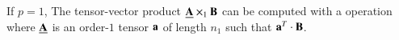 \begin{comment}
\midrule
6 & $>2$ & any    & $\pi_1$  & \tf{gemm(rm)} & $\mbB$  & $\mbnq$ & $m$     & $n_q$ & $\mubA$ & $n_q$ & $\mbB$  & $n_q$ & $m$\\
  & $>2$ & any    & $\pi_1$  & \tf{gemm(cm)} & $\mbB$  & $m$     & $\mbnq$ & $n_q$ & $\mbB$  & $n_q$ & $\mubA$ & $n_q$ & $m$\\
7 & $>2$ & any    & $\pi_p$  & \tf{gemm(rm)} & -       & $m$     & $\mbnq$ & $n_q$ & $\mbB$  & $n_q$ & $\mubA$  & $\mbnq$ & $\mbnq$ \\
  & $>2$ & any    & $\pi_p$  & \tf{gemm(cm)} & -       & $\mbnq$ & $m$     & $n_q$ & $\mubA$  & $\mbnq$ & $\mbB$  & $n_q$ & $\mbnq$ \\
\midrule
8 & $>2$ & any & \ $\pi_2,..,\pi_{p-1}$ \ & \tf{gemm(rm)*} & - & $m$ & $n_{\pi_1}$ & $n_q$ & $\mbB$ & $n_q$ & $\mubA$ & $w_{q}$  & $w_{q}$ \\
  & $>2$ & any & \ $\pi_2,..,\pi_{p-1}$ \ & \tf{gemm(cm)*} & - & $n_{\pi_1}$ & $m$ & $n_q$ & $\mubA$ & $w_{q}$ & $\mbB$ & $n_q$ & $w_{q}$ \\
\bottomrule \\
\end{tabular}
\caption%
{%
\footnotesize
Eight cases with \tf{gemv} and \tf{gemm} for the mode-$q$ tensor-matrix multiplication.
Arguments \tf{T}, \tf{M}, \tf{N}, etc. of the BLAS are chosen with respect to the tensor order $p$, layout $\mbpi$ and contraction mode $q$ where \tf{T} specifies if $\mbB$ is transposed.
\tf{gemm*} denotes multiple \tf{gemm} calls with different tensor slices.
Argument $\bar{n}_q$ for case 6 and 7 is given by $\bar{n}_q = 1/n_q \prod_r^p n_r$.
Matrix $\mbB$ has the row-major format.
}
\label{tab:mapping_rm}
\end{table*}
\end{comment}



If $p=1$, The tensor-vector product $\underline{\mathbf{A}} \times_1 \mathbf{B}$ can be computed with a  operation where $\underline{\mathbf{A}}$ is an order-$1$ tensor $\mathbf{a}$ of length $n_1$ such that $\mathbf{a}^T \cdot \mathbf{B}$.

